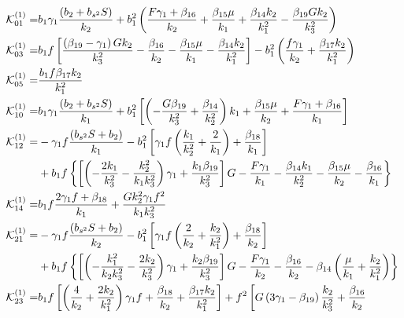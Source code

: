 \begin{align}
\ko^{(1)}_{01}=&
 b_{1}\gamma_{1}\frac{\left( b_{2}+b_{s^2} S \right)}{k_{2}}
+ b_{1}^{2}
\left(\frac{F \gamma_{1}+\beta_{16}}{k_{2}}+\frac{\beta_{15} \mu}{k_{1}}+\frac{\beta_{14}k_{2} }{k_{1}^{2}}-\frac{  \beta_{19}G k_{2}}{k_{3}^{2}}\right)
%
 \\ \ko^{(1)}_{03}=& b_{1}f\left[\frac{\left(\beta_{19}-\gamma_{1}\right) G k_{2}}{k_{3}^{2}}-\frac{\beta_{16}}{k_{2}}-\frac{\beta_{15} \mu}{k_{1}}-\frac{\beta_{14} k_{2} }{k_{1}^{2}}\right] 
 -b_{1}^{2}\left(\frac{f \gamma_{1}}{k_{2}}+\frac{ \beta_{17}k_{2}}{k_{1}^{2}}\right) 
 \\ \ko^{(1)}_{05}=&  \frac{b_{1}f \beta_{17}k_{2} }{k_{1}^{2}}
 \\ \ko^{(1)}_{10}=& b_{1}\gamma_{1}\frac{\left(b_{2}+b_{s^2} S \right)}{k_{1}}+  b_{1}^{2}\left[\left(-\frac{G \beta_{19}}{k_{3}^{2}}+\frac{\beta_{14}}{k_{2}^{2}}\right) k_{1}+\frac{\beta_{15} \mu}{k_{2}}+\frac{F \gamma_{1}+\beta_{16}}{k_{1}}\right]
 \\ \ko^{(1)}_{12}=&  - \gamma_{1} f\frac{\left(b_{s^2} S+b_{2}\right)}{k_{1}}-  b_{1}^{2}\left[\gamma_{1} f\left(\frac{k_{1}}{k_{2}^{2}}+\frac{2}{k_{1}}\right) +\frac{\beta_{18}}{k_{1}}\right]\\&
 + b_{1}f\left\{\left[\left(-\frac{2 k_{1}}{k_{3}^{2}}-\frac{k_{2}^{2}}{k_{1} k_{3}^{2}}\right) \gamma_{1}+\frac{k_{1} \beta_{19}}{k_{3}^{2}}\right] G-\frac{F \gamma_{1}}{k_{1}}-\frac{\beta_{14} k_{1}}{k_{2}^{2}}-\frac{\beta_{15} \mu}{k_{2}}-\frac{\beta_{16}}{k_{1}}\right\}
 \\ \ko^{(1)}_{14}=&  b_{1}f\frac{2 \gamma_{1} f+\beta_{18}}{k_{1}}+\frac{G k_{2}^{2} \gamma_{1} f^{2}}{k_{1} k_{3}^{2}}
 \\ \ko^{(1)}_{21}=& -\gamma_{1} f\frac{\left(b_{s^2} S+ b_{2}\right)}{k_{2}}
  -b_{1}^{2}\left[\gamma_1 f\left(\frac{2}{k_{2}}+\frac{k_{2}}{k_{1}^{2}}\right) +\frac{\beta_{18}}{k_{2}}\right] \\
 &+b_1f\left\{\left[\left(-\frac{k_{1}^{2}}{k_{2} k_{3}^{2}}-\frac{2 k_{2}}{k_{3}^{2}}\right) \gamma_{1}+\frac{k_{2} \beta_{19}}{k_{3}^{2}}\right] G-\frac{F \gamma_{1}}{k_{2}}-\frac{\beta_{16}}{k_{2}}-\beta_{14}\left(\frac{ \mu}{k_{1}}+\frac{k_{2} }{k_{1}^{2}}\right)\right\}
 \\ \ko^{(1)}_{23}=&  b_{1}f\left[\left(\frac{4}{k_{2}}+\frac{2 k_{2}}{k_{1}^{2}}\right) \gamma_{1} f+\frac{\beta_{18}}{k_{2}}+\frac{\beta_{17} k_{2} }{k_{1}^{2}} \right]+f^{2}\left[G\left(3 \gamma_{1}-\beta_{19}\right) \frac{k_{2} }{k_{3}^{2}}+\frac{\beta_{16}}{k_{2}} \right. \nonumber \\

\end{align}
